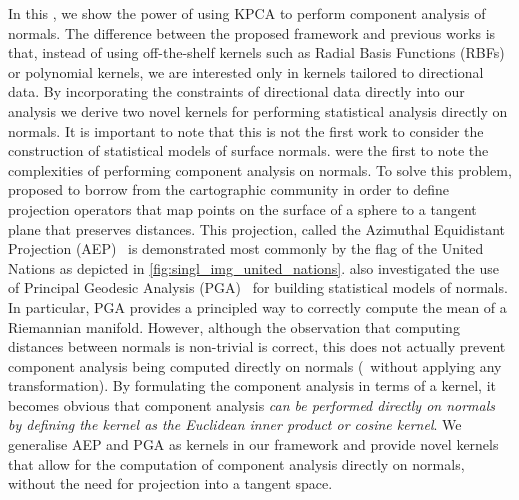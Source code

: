 In this , we show the power of using KPCA to perform
component analysis of normals. The difference between the proposed framework and
previous works is that, instead of using off-the-shelf kernels such as Radial
Basis Functions (RBFs) or polynomial kernels, we are interested only in kernels
tailored to directional data. By incorporating the constraints of directional
data directly into our analysis we derive two novel kernels for performing
statistical analysis directly on normals. It is important to note that this is
not the first work to consider the construction of statistical models of surface
normals. \citet{smith2006recovering,smith2008facial} were the
first to note the complexities of performing component analysis on normals. To
solve this problem, \citet{smith2006recovering,smith2008facial} 
proposed to borrow from the cartographic
community in order to define projection operators that map points on the surface
of a sphere to a tangent plane that preserves distances. This projection, called
the Azimuthal Equidistant Projection (AEP)~\cite{snyder1987map} is demonstrated
most commonly by the flag of the United Nations as depicted in
\cref{fig:singl_img_united_nations}.
\citet{smith2008facial} also investigated the use of
Principal Geodesic Analysis (PGA)~\cite{fletcher2004principal,smith2008facial}
for building statistical models of normals. In particular, PGA provides a
principled way to correctly compute the mean of a Riemannian manifold. However,
although the observation that computing distances between normals is non-trivial
is correct, this does not actually prevent component analysis being computed
directly on normals (\ie~without applying any transformation). By formulating
the component analysis in terms of a kernel, it becomes obvious that component
analysis \textit{can be performed directly on normals by defining the kernel as
the Euclidean inner product or cosine kernel}. We generalise AEP and PGA as
kernels in our framework and provide novel kernels that allow for the
computation of component analysis directly on normals, without the need for
projection into a tangent space.

